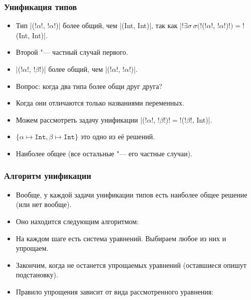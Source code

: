 \documentclass[11pt]{beamer}
\begin{document}
\begin{frame}[fragile]
  \frametitle{Унификация типов}
  \begin{itemize}
    \item Тип \haskinline|(!$\alpha$!, !$\alpha$!)| более общий, чем \haskinline|(Int, Int)|, так как  \haskinline|!$\exists \sigma\ \sigma($!(!$\alpha$!, !$\alpha$!)!$)=$!(Int, Int)|.
    \item Второй "--- частный случай первого.
          \pause
    \item \haskinline|(!$\alpha$!, !$\beta$!)| более общий, чем \haskinline|(!$\alpha$!, !$\alpha$!)|.
          \pause
    \item Вопрос: когда два типа более общи друг друга?
          \pause
    \item Когда они отличаются только названиями переменных.
          \pause
    \item Можем рассмотреть задачу унификации \haskinline|(!$\alpha$!, !$\beta$!)!$=$!(!$\beta$!, Int)|.
          \pause
    \item $\{ \alpha \mapsto \mathtt{Int}, \beta \mapsto \mathtt{Int} \}$ это одно из её решений.
          \pause
    \item Наиболее общее (все остальные "--- его частные случаи).
  \end{itemize}
\end{frame}

\begin{frame}[fragile]
  \frametitle{Алгоритм унификации}
  \begin{itemize}
    \item Вообще, у каждой задачи унификации типов есть наиболее общее решение (или нет вообще).
    \item Оно находится следующим алгоритмом:
          \pause
    \item На каждом шаге есть система уравнений. Выбираем любое из них и упрощаем.
    \item Закончим, когда не останется упрощаемых уравнений (оставшиеся опишут подстановку).
    \item Правило упрощения зависит от вида рассмотренного уравнения:
  \end{itemize}
\end{frame}
\end{document}
